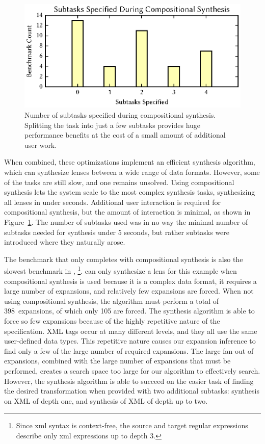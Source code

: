 \documentclass[acmsmall,screen]{acmart}
\begin{document}
\begin{figure}
  \includegraphics{generated-graphs/compositional}
  \caption{Number of subtasks specified during compositional synthesis.
    Splitting the task into just a few subtasks provides huge performance
    benefits at the cost of a small amount of additional user work.} 
  \label{fig:compositional-graph}
\end{figure}

When combined, these optimizations implement an efficient synthesis algorithm, which can
synthesize lenses between a wide range of data formats.  However, some of the
tasks are still slow, and one remains unsolved.
Using compositional synthesis lets the system scale to the most complex
synthesis tasks, synthesizing all lenses in under \SynthesizedUnder seconds.
Additional user interaction is required for compositional synthesis, but the
amount of interaction is minimal, as shown in
Figure~\ref{fig:compositional-graph}.  The number of subtasks used was in no way
the minimal number of subtasks needed for synthesis under 5 seconds, but rather
subtasks were introduced where they naturally arose.

The benchmark that only completes with compositional synthesis is also
the slowest benchmark in \FullMode{},
\footnote{Since xml syntax is context-free, 
  the source and target regular 
  expressions describe only xml expressions up to depth 3.}.  \Optician{} can
only synthesize a lens for this example when compositional synthesis is used
because it is a 
complex data format, it requires a large
number of expansions, and relatively few expansions are forced.
When not using compositional synthesis, the algorithm must perform a
total of 
398~expansions, of which only 105 are forced.  
The synthesis algorithm is able to force so few expansions because of the highly
repetitive nature of the  specification.  XML tags occur at many
different levels, and they all use the same user-defined data types.
This repetitive nature causes our
expansion inference to find only a few of the large number of required
expansions.  The large fan-out of expansions, combined with the large number
of expansions that must be performed, creates 
a search space too large for our algorithm to effectively search.  However, the
synthesis algorithm is able to succeed on the easier task of finding the desired
transformation when provided with two additional subtasks: synthesis on XML of
depth one, and synthesis of XML of depth up to two.
\end{document}
